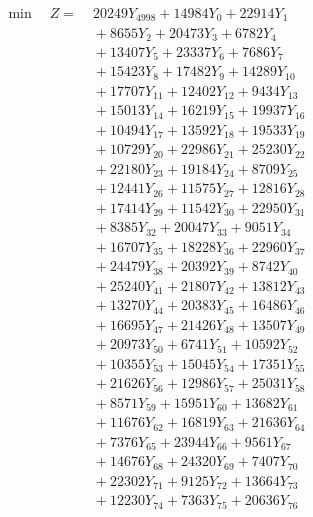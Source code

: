 \documentclass[a4paper,10pt]{article}
\begin{document}
\allowdisplaybreaks
{\small
\begin{align}
\min \quad Z = &\; 20249 Y_{4998} + 14984 Y_{0} + 22914 Y_{1} \\[0.3ex]
&\;  + 8655 Y_{2} + 20473 Y_{3} + 6782 Y_{4} \\[0.3ex]
&\;  + 13407 Y_{5} + 23337 Y_{6} + 7686 Y_{7} \\[0.3ex]
&\;  + 15423 Y_{8} + 17482 Y_{9} + 14289 Y_{10} \\[0.3ex]
&\;  + 17707 Y_{11} + 12402 Y_{12} + 9434 Y_{13} \\[0.3ex]
&\;  + 15013 Y_{14} + 16219 Y_{15} + 19937 Y_{16} \\[0.3ex]
&\;  + 10494 Y_{17} + 13592 Y_{18} + 19533 Y_{19} \\[0.3ex]
&\;  + 10729 Y_{20} + 22986 Y_{21} + 25230 Y_{22} \\[0.3ex]
&\;  + 22180 Y_{23} + 19184 Y_{24} + 8709 Y_{25} \\[0.3ex]
&\;  + 12441 Y_{26} + 11575 Y_{27} + 12816 Y_{28} \\[0.5ex]\allowbreak
&\;  + 17414 Y_{29} + 11542 Y_{30} + 22950 Y_{31} \\[0.3ex]
&\;  + 8385 Y_{32} + 20047 Y_{33} + 9051 Y_{34} \\[0.3ex]
&\;  + 16707 Y_{35} + 18228 Y_{36} + 22960 Y_{37} \\[0.3ex]
&\;  + 24479 Y_{38} + 20392 Y_{39} + 8742 Y_{40} \\[0.3ex]
&\;  + 25240 Y_{41} + 21807 Y_{42} + 13812 Y_{43} \\[0.3ex]
&\;  + 13270 Y_{44} + 20383 Y_{45} + 16486 Y_{46} \\[0.3ex]
&\;  + 16695 Y_{47} + 21426 Y_{48} + 13507 Y_{49} \\[0.3ex]
&\;  + 20973 Y_{50} + 6741 Y_{51} + 10592 Y_{52} \\[0.3ex]
&\;  + 10355 Y_{53} + 15045 Y_{54} + 17351 Y_{55} \\[0.3ex]
&\;  + 21626 Y_{56} + 12986 Y_{57} + 25031 Y_{58} \\[0.5ex]\allowbreak
&\;  + 8571 Y_{59} + 15951 Y_{60} + 13682 Y_{61} \\[0.3ex]
&\;  + 11676 Y_{62} + 16819 Y_{63} + 21636 Y_{64} \\[0.3ex]
&\;  + 7376 Y_{65} + 23944 Y_{66} + 9561 Y_{67} \\[0.3ex]
&\;  + 14676 Y_{68} + 24320 Y_{69} + 7407 Y_{70} \\[0.3ex]
&\;  + 22302 Y_{71} + 9125 Y_{72} + 13664 Y_{73} \\[0.3ex]
&\;  + 12230 Y_{74} + 7363 Y_{75} + 20636 Y_{76} \\[0.3ex]

\end{align}}
\end{document}
